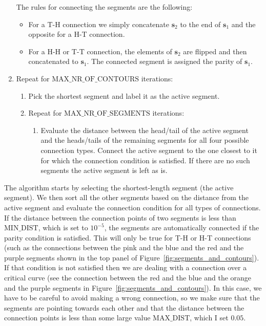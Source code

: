 \documentclass[12pt,dvipsnames]{report}
\begin{document}
\begin{enumerate}
    The rules for connecting the segments are the following:
    \begin{itemize}
        \item  For a T-H connection we simply concatenate $\mathbf{s}_2$ to the end of $\mathbf{s}_1$ 
        and the opposite for a H-T connection.
        \item For a H-H or T-T connection, the elements of $\mathbf{s}_2$ are flipped and then concatenated
        to $\mathbf{s}_1$. The connected segment is assigned the parity of $\mathbf{s}_1$.
    \end{itemize}
    \item Repeat for $\text{MAX\_NR\_OF\_CONTOURS}$ iterations:
    \begin{enumerate}
    \item Pick the shortest segment and label it as the active segment.
    \item Repeat for $\text{MAX\_NR\_OF\_SEGMENTS}$ iterations:
    \begin{enumerate}
    \item Evaluate the distance between the head/tail of the active segment and the 
    heads/tails of the remaining segments for all four possible connection types. 
    Connect the active segment to the one closest to it for which the connection 
    condition is satisfied.  If there are no such segments the active segment is left as is.
    \end{enumerate}
    \end{enumerate}
\end{enumerate}

The algorithm starts by selecting the shortest-length segment (the active segment). 
We then sort all the other segments based on the distance from the active segment and evaluate
the connection condition for all types of connections. If the distance between the connection
points of two segments is less than $\text{MIN\_DIST}$, which is set to $10^{-5}$, the segments
are automatically connected if the parity condition is satisfied. This will only be true 
for T-H or H-T connections (such as the connections between the pink and the blue and the red 
and the purple segments shown in the top panel of Figure~\ref{fig:segments_and_contours}).
If that condition is not satisfied then we are dealing with a connection over a critical curve 
(see the connection between the red and the blue and the orange and the purple segments 
in Figure~\ref{fig:segments_and_contours}).
In this case, we have to be careful to avoid making a wrong connection, so we make sure that the 
segments are pointing towards each other and that the distance between the connection points 
is less than some large value $\text{MAX\_DIST}$, which I set $0.05$. 
\end{document}
